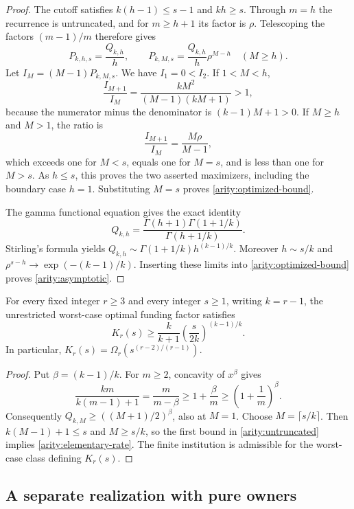 \begin{proof}
The cutoff satisfies $k(h-1)\leq s-1$ and $kh\geq s$.  Through $m=h$ the
recurrence is untruncated, and for $m\geq h+1$ its factor is $\rho$.
Telescoping the factors $(m-1)/m$ therefore gives
\[
  P_{k,h,s}=\frac{Q_{k,h}}{h},\qquad
  P_{k,M,s}=\frac{Q_{k,h}}{h}\rho^{M-h}\quad(M\geq h).
\]
Let $I_M=(M-1)P_{k,M,s}$.  We have $I_1=0<I_2$.  If $1<M<h$,
\[
  \frac{I_{M+1}}{I_M}
  =\frac{kM^2}{(M-1)(kM+1)}>1,
\]
because the numerator minus the denominator is $(k-1)M+1>0$.  If
$M\geq h$ and $M>1$, the ratio is
\[
  \frac{I_{M+1}}{I_M}=\frac{M\rho}{M-1},
\]
which exceeds one for $M<s$, equals one for $M=s$, and is less than one
for $M>s$.  As $h\leq s$, this proves the two asserted maximizers, including
the boundary case $h=1$.  Substituting $M=s$ proves
\eqref{arity:optimized-bound}.

The gamma functional equation gives the exact identity
\[
  Q_{k,h}
  =\frac{\Gamma(h+1)\Gamma(1+1/k)}{\Gamma(h+1/k)}.
\]
Stirling's formula yields
$Q_{k,h}\sim\Gamma(1+1/k)h^{(k-1)/k}$.  Moreover $h\sim s/k$ and
$\rho^{s-h}\longrightarrow\exp(-(k-1)/k)$.
Inserting these limits into \eqref{arity:optimized-bound} proves
\eqref{arity:asymptotic}.
\end{proof}

\begin{corollary}
\label{arity:all-s}
For every fixed integer $r\geq3$ and every integer $s\geq1$, writing
$k=r-1$, the unrestricted worst-case optimal funding factor satisfies
\begin{equation}
  K_r(s)\geq
  \frac{k}{k+1}\left(\frac{s}{2k}\right)^{(k-1)/k}.
  \label{arity:elementary-rate}
\end{equation}
In particular,
$K_r(s)=\Omega_r(s^{(r-2)/(r-1)})$.
\end{corollary}

\begin{proof}
Put $\beta=(k-1)/k$.  For $m\geq2$, concavity of $x^\beta$ gives
\[
  \frac{km}{k(m-1)+1}
    =\frac{m}{m-\beta}
    \geq1+\frac{\beta}{m}
    \geq\left(1+\frac1m\right)^\beta.
\]
Consequently $Q_{k,M}\geq((M+1)/2)^\beta$, also at $M=1$.
Choose $M=\lceil s/k\rceil$.  Then
$k(M-1)+1\leq s$ and $M\geq s/k$, so the first bound in
\eqref{arity:untruncated} implies \eqref{arity:elementary-rate}.
The finite institution is admissible for the worst-case class defining
$K_r(s)$.
\end{proof}

\subsection{A separate realization with pure owners}
\label{arity:pure-section}

